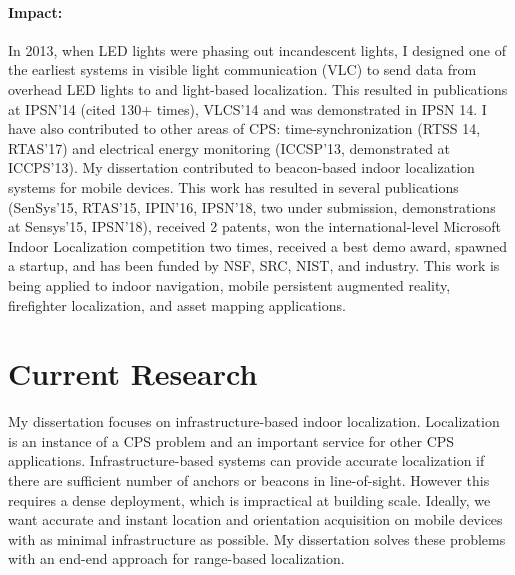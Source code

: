 \documentclass[10pt]{article}
\begin{document}



\paragraph{Impact:}  In 2013, when LED lights were phasing out
incandescent lights, I designed one of the earliest systems in visible
light communication (VLC) to send data from overhead LED lights to and
light-based localization. This resulted in publications at IPSN'14
(cited 130+ times), VLCS'14 and was demonstrated in IPSN 14. I have
also contributed to other areas of CPS: time-synchronization (RTSS 14,
RTAS'17) and electrical energy monitoring (ICCSP'13, demonstrated at
ICCPS'13). My dissertation contributed to beacon-based indoor
localization systems for mobile devices. This work has resulted in
several publications (SenSys'15, RTAS'15, IPIN'16, IPSN'18, two under
submission, demonstrations at Sensys'15, IPSN'18), received 2 patents,
won the international-level Microsoft Indoor Localization competition
two times, received a best demo award, spawned a startup, and has been
funded by NSF, SRC, NIST, and industry. This work is being applied to
indoor navigation, mobile persistent augmented reality, firefighter
localization, and asset mapping applications.

\section{Current Research}

My dissertation focuses on infrastructure-based indoor
localization. Localization is an instance of a CPS problem and an
important service for other CPS applications. Infrastructure-based
systems can provide accurate localization if there are sufficient
number of anchors or beacons in line-of-sight. However this requires a
dense deployment, which is impractical at building scale. Ideally, we
want accurate and instant location and orientation acquisition on
mobile devices with as minimal infrastructure as possible. My
dissertation solves these problems with an end-end approach for
range-based localization.
\end{document}
